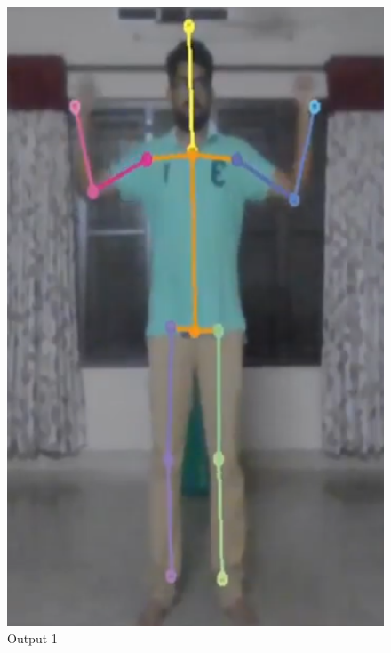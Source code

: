 \documentclass{fisatprojectfinal}
\begin{document}
\begin{figure}[h!]
	\begin{center}
	\includegraphics[scale=0.7]{pose-2}
	\caption{Output 1}
\end{center}
\end{figure}
\end{document}
